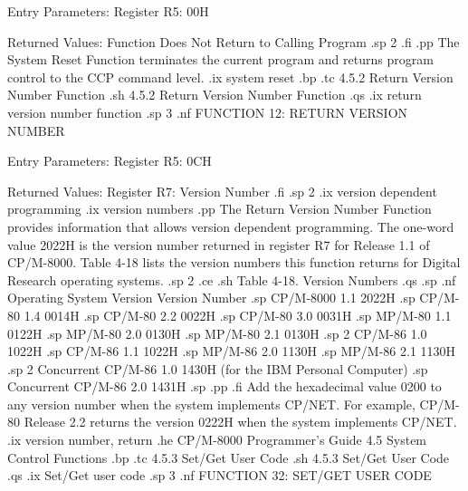               Entry Parameters:
                 Register   R5:  00H

              Returned  Values:  Function Does Not
                                 Return to Calling
                                 Program
.sp 2
.fi
.pp
The System Reset Function terminates the current program and returns
program control to the CCP command level. 
.ix system reset
.bp
.tc         4.5.2  Return Version Number Function
.sh
4.5.2  Return Version Number Function
.qs
.ix return version number function
.sp 3
.nf
               FUNCTION 12:  RETURN VERSION NUMBER

                Entry Parameters:
                   Register   R5:  0CH

                Returned  Values:
                   Register   R7:  Version Number
.fi
.sp 2
.ix version dependent programming
.ix version numbers
.pp
The Return Version Number Function provides information that
allows version dependent programming. The one-word value 2022H is
the version number returned in register   R7 for Release 1.1 of CP/M-8000.
Table 4-18 lists the version numbers this function returns
for Digital Research operating systems. 
.sp 2
.ce
.sh
Table 4-18.  Version Numbers 
.qs
.sp 
.nf
     Operating System             Version       Version Number
.sp
        CP/M-8000                    1.1             2022H
.sp
        CP/M-80                     1.4             0014H
.sp
        CP/M-80                     2.2             0022H
.sp
        CP/M-80                     3.0             0031H
.sp 
        MP/M-80                     1.1             0122H
.sp
        MP/M-80                     2.0             0130H
.sp
        MP/M-80                     2.1             0130H
.sp 2
        CP/M-86                     1.0             1022H
.sp
        CP/M-86                     1.1             1022H
.sp
        MP/M-86                     2.0             1130H
.sp
        MP/M-86                     2.1             1130H
.sp 2
     Concurrent CP/M-86             1.0             1430H
     (for the IBM 
      Personal Computer)                   
.sp 
     Concurrent CP/M-86             2.0             1431H
.sp 
.pp
.fi
Add the hexadecimal value 0200 to any version number when the
system implements CP/NET.   For example, CP/M-80 Release 2.2
returns the version 0222H when the system implements CP/NET.
.ix version number, return
.he CP/M-8000 Programmer's Guide          4.5 System Control Functions
.bp
.tc         4.5.3  Set/Get User Code
.sh
4.5.3  Set/Get User Code
.qs
.ix Set/Get user code
.sp 3
.nf
                 FUNCTION 32:  SET/GET USER CODE


